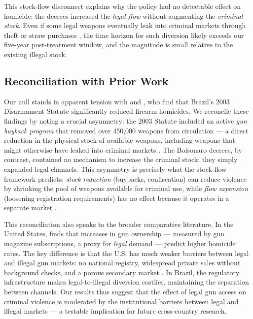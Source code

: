 \documentclass[12pt]{article}
\begin{document}
This stock-flow disconnect explains why the policy had no detectable effect on homicide: the decrees increased the \textit{legal flow} without augmenting the \textit{criminal stock}. Even if some legal weapons eventually leak into criminal markets through theft or straw purchases \citep{cookludwig2006, knight2013guntrace}, the time horizon for such diversion likely exceeds our five-year post-treatment window, and the magnitude is small relative to the existing illegal stock.

\subsection{Reconciliation with Prior Work}

Our null stands in apparent tension with \citet{cerqueiramello2013} and \citet{almeidahartung2021}, who find that Brazil's 2003 Disarmament Statute significantly reduced firearm homicides. We reconcile these findings by noting a crucial asymmetry: the 2003 Statute included an active \textit{gun buyback program} that removed over 450,000 weapons from circulation --- a direct reduction in the physical stock of available weapons, including weapons that might otherwise have leaked into criminal markets \citep{depetris2021disarmament}. The Bolsonaro decrees, by contrast, contained no mechanism to increase the criminal stock; they simply expanded legal channels. This asymmetry is precisely what the stock-flow framework predicts: \textit{stock reduction} (buybacks, confiscation) can reduce violence by shrinking the pool of weapons available for criminal use, while \textit{flow expansion} (loosening registration requirements) has no effect because it operates in a separate market \citep{dix2020enough}.

This reconciliation also speaks to the broader comparative literature. In the United States, \citet{duggan2001more} finds that increases in gun ownership --- measured by gun magazine subscriptions, a proxy for \textit{legal} demand --- predict higher homicide rates. The key difference is that the U.S. has much weaker barriers between legal and illegal gun markets: no national registry, widespread private sales without background checks, and a porous secondary market \citep{cookludwig2006}. In Brazil, the regulatory infrastructure makes legal-to-illegal diversion costlier, maintaining the separation between channels. Our results thus suggest that the effect of legal gun access on criminal violence is moderated by the institutional barriers between legal and illegal markets --- a testable implication for future cross-country research.
\end{document}
